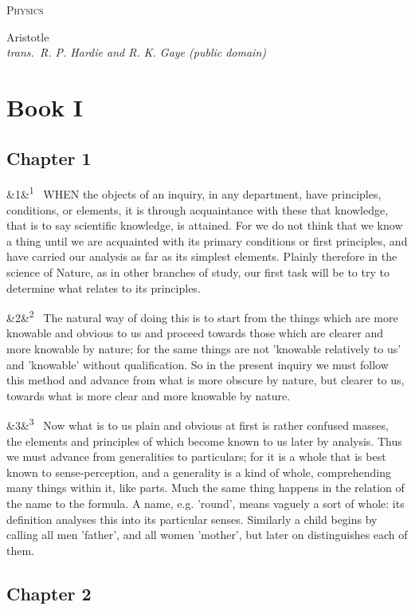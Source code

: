 \documentclass[12pt]{article}
\newcommand{\work}[1]{\begin{center}\LARGE\scshape #1\end{center}}
\newcommand{\attrib}[2]{\begin{center}\large #1\\[2pt]\small\itshape trans.\ #2\end{center}\vspace{1em}}
\newcommand{\para}[1][]{\par\noindent\ifx&#1&\else\textsuperscript{\footnotesize #1}~\fi}
\begin{document}
\work{Physics}

\attrib{Aristotle}{R. P. Hardie and R. K. Gaye (public domain)}

\section*{Book I}

\subsection*{Chapter 1}

\para[1] WHEN the objects of an inquiry, in any department, have principles, conditions, or elements, it is through acquaintance with these that knowledge, that is to say scientific knowledge, is attained. For we do not think that we know a thing until we are acquainted with its primary conditions or first principles, and have carried our analysis as far as its simplest elements. Plainly therefore in the science of Nature, as in other branches of study, our first task will be to try to determine what relates to its principles.

\para[2] The natural way of doing this is to start from the things which are more knowable and obvious to us and proceed towards those which are clearer and more knowable by nature; for the same things are not 'knowable relatively to us' and 'knowable' without qualification. So in the present inquiry we must follow this method and advance from what is more obscure by nature, but clearer to us, towards what is more clear and more knowable by nature.

\para[3] Now what is to us plain and obvious at first is rather confused masses, the elements and principles of which become known to us later by analysis. Thus we must advance from generalities to particulars; for it is a whole that is best known to sense-perception, and a generality is a kind of whole, comprehending many things within it, like parts. Much the same thing happens in the relation of the name to the formula. A name, e.g. 'round', means vaguely a sort of whole: its definition analyses this into its particular senses. Similarly a child begins by calling all men 'father', and all women 'mother', but later on distinguishes each of them.

\subsection*{Chapter 2}
\end{document}
